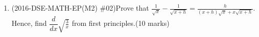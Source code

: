 \documentclass[12pt]{article}
\begin{document}
\begin{enumerate}
            \hrulefill
            
            \hrulefill
            
            \hrulefill
            
            \hrulefill
            
            \hrulefill
            
            \hrulefill
            
            \hrulefill

        \pagebreak
        \item (2016-DSE-MATH-EP(M2) \#02)Prove that $\displaystyle \frac{1}{\sqrt{x}}-\frac{1}{\sqrt{x+h}}=\frac{h}{(x+h)\sqrt{x}+x\sqrt{x+h}}$. Hence, find $\displaystyle \dfrac{d}{dx}\sqrt{\frac{3}{x}}$ from first principles.\hfill(10 marks)
        
        \hrulefill
            
            \hrulefill
            
            \hrulefill
            
            \hrulefill
            
            \hrulefill
            
            \hrulefill
            
            \hrulefill
            
            \hrulefill
            
            \hrulefill
            
            \hrulefill
            
            \hrulefill
            
            \hrulefill
            
            \hrulefill
            
            \hrulefill

            \hrulefill
            
            \hrulefill
            
            \hrulefill
            
            \hrulefill
            
            \hrulefill
            
            \hrulefill
            
            \hrulefill
            
            \hrulefill
            
            \hrulefill
            

\end{enumerate}
\end{document}
